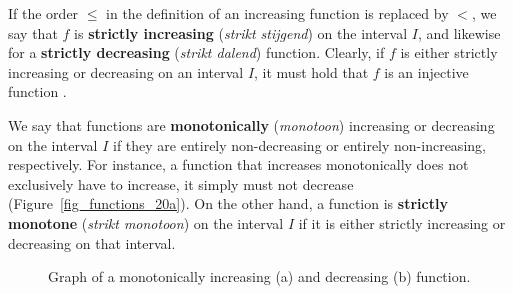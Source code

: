 If the order $\leq$ in the definition of an increasing function is replaced by $<$,  we say that $f$ is \textbf{strictly increasing} (\textit{strikt stijgend}) on the interval $I$, and likewise for a \textbf{strictly decreasing} (\textit{strikt dalend}) function. Clearly, if $f$ is either strictly increasing or decreasing on an interval $I$, it must hold that $f$ is an injective function .  

We say that functions are \textbf{monotonically} (\textit{monotoon}) increasing or decreasing on the interval $I$ if they are entirely non-decreasing or entirely non-increasing, respectively. For instance, a function that increases monotonically does not exclusively have to increase, it simply must not decrease (Figure~\ref{fig_functions_20a}). On the other hand, a function is \textbf{strictly monotone} (\textit{strikt monotoon}) on the interval $I$ if it is either strictly increasing or decreasing on that interval. 
 
 
\begin{figure}
\centering
\centerline{
\hspace{0.5cm}
}
\caption{Graph of a monotonically increasing (a) and decreasing (b) function. }
\label{fig_functions_20}
\end{figure}



